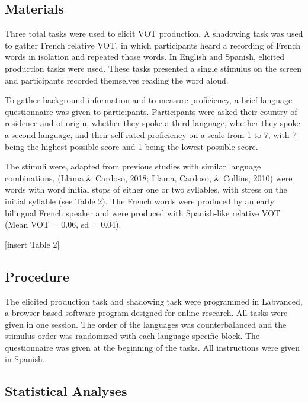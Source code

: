 \documentclass[
  english,
  man]{apa6}
\begin{document}
\hypertarget{materials}{%
\subsection{Materials}\label{materials}}

Three total tasks were used to elicit VOT production.
A shadowing task was used to gather French relative VOT, in which participants heard a recording of French words in isolation and repeated those words.
In English and Spanish, elicited production tasks were used.
These tasks presented a single stimulus on the screen and participants recorded themselves reading the word aloud.

To gather background information and to measure proficiency, a brief language questionnaire was given to participants.
Participants were asked their country of residence and of origin, whether they spoke a third language, whether they spoke a second language, and their self-rated proficiency on a scale from 1 to 7, with 7 being the highest possible score and 1 being the lowest possible score.

The stimuli were, adapted from previous studies with similar language combinations, (Llama \& Cardoso, 2018; Llama, Cardoso, \& Collins, 2010) were words with word initial stops of either one or two syllables, with stress on the initial syllable (see Table 2).
The French words were produced by an early bilingual French speaker and were produced with Spanish-like relative VOT (Mean VOT = 0.06, sd = 0.04).

{[}insert Table 2{]}

\hypertarget{procedure}{%
\subsection{Procedure}\label{procedure}}

The elicited production task and shadowing task were programmed in Labvanced, a browser based software program designed for online research.
All tasks were given in one session.
The order of the languages was counterbalanced and the stimulus order was randomized with each language specific block.
The questionnaire was given at the beginning of the tasks.
All instructions were given in Spanish.

\hypertarget{statistical-analyses}{%
\subsection{Statistical Analyses}\label{statistical-analyses}}
\end{document}
